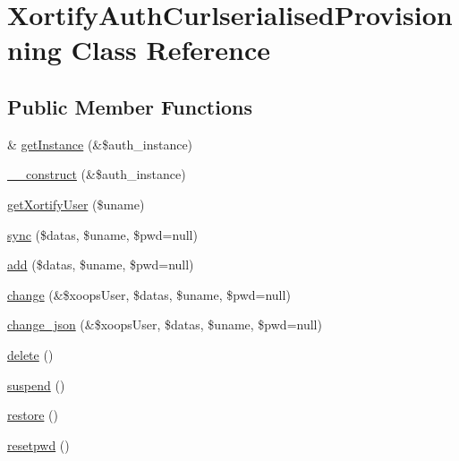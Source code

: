 \hypertarget{class_xortify_auth_curlserialised_provisionning}{\section{Xortify\-Auth\-Curlserialised\-Provisionning Class Reference}
\label{class_xortify_auth_curlserialised_provisionning}
}
\subsection*{Public Member Functions}
\begin{DoxyCompactItemize}
\item 
\& \hyperlink{class_xortify_auth_curlserialised_provisionning_a2c8eaa915c70d75289ac8a03686194f9}{get\-Instance} (\&\$auth\-\_\-instance)
\item 
\hyperlink{class_xortify_auth_curlserialised_provisionning_a0f25832dc86774e7605b81fe57b083c2}{\-\_\-\-\_\-construct} (\&\$auth\-\_\-instance)
\item 
\hyperlink{class_xortify_auth_curlserialised_provisionning_a041d726ac26672547ed1504e8e0117aa}{get\-Xortify\-User} (\$uname)
\item 
\hyperlink{class_xortify_auth_curlserialised_provisionning_a35dc08b0f2138eb818ff95345b73bcff}{sync} (\$datas, \$uname, \$pwd=null)
\item 
\hyperlink{class_xortify_auth_curlserialised_provisionning_adfc9fcef01e7bd7b2f47e8e79d51fc63}{add} (\$datas, \$uname, \$pwd=null)
\item 
\hyperlink{class_xortify_auth_curlserialised_provisionning_ae1f0971b9712c794620cf309164e43af}{change} (\&\$xoops\-User, \$datas, \$uname, \$pwd=null)
\item 
\hyperlink{class_xortify_auth_curlserialised_provisionning_a94f4e0408f26e65abca347ec883f4ec9}{change\-\_\-json} (\&\$xoops\-User, \$datas, \$uname, \$pwd=null)
\item 
\hyperlink{class_xortify_auth_curlserialised_provisionning_a13bdffdd926f26b825ea57066334ff01}{delete} ()
\item 
\hyperlink{class_xortify_auth_curlserialised_provisionning_ad73006a505121228f3b075c2409787d2}{suspend} ()
\item 
\hyperlink{class_xortify_auth_curlserialised_provisionning_aa1371f22826cf8cde4454c9b467203d0}{restore} ()
\item 
\hyperlink{class_xortify_auth_curlserialised_provisionning_a06d70fbd3a2db390b6f2530c0076628e}{resetpwd} ()
\end{DoxyCompactItemize}
